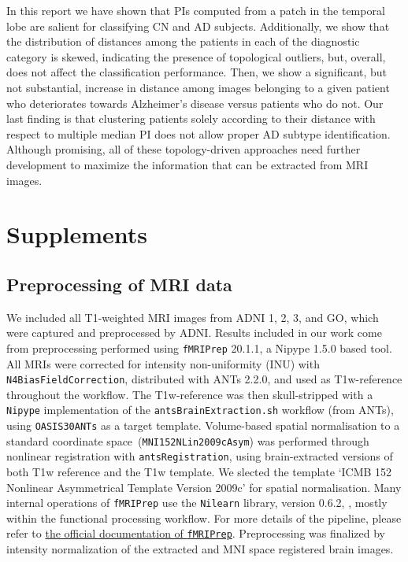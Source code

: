\documentclass{article}
\begin{document}
In this report we have shown that PIs computed from a patch in the temporal lobe are salient for
classifying CN and AD subjects. Additionally, we show that the distribution of distances among the
patients in each of the diagnostic category is skewed, indicating the presence of topological
outliers, but, overall, does not affect the classification performance. Then, we show a significant,
but not substantial, increase in distance among images belonging to a given patient who deteriorates
towards Alzheimer's disease versus patients who do not. Our last finding is that clustering patients
solely according to their distance with respect to multiple median PI does not allow proper AD
subtype identification. Although promising, all of these topology-driven approaches need further
development to maximize the information that can be extracted from MRI images.

\clearpage



\clearpage
\appendix

\section{Supplements}
\subsection{Preprocessing of MRI data}\label{apd:preprocessing}
We included all T1-weighted MRI images from ADNI 1, 2, 3, and GO, which were captured and
preprocessed by ADNI. Results included in our work come from preprocessing performed using
\texttt{fMRIPrep} 20.1.1, a Nipype 1.5.0 based tool. All MRIs were corrected for intensity
non-uniformity (INU) with \texttt{N4BiasFieldCorrection}, distributed with ANTs 2.2.0, and used as
T1w-reference throughout the workflow. The T1w-reference was then skull-stripped with a
\texttt{Nipype} implementation of the \texttt{antsBrainExtraction.sh} workflow (from ANTs), using
\texttt{OASIS30ANTs} as a target template.
Volume-based spatial normalisation to a standard coordinate space~(\texttt{MNI152NLin2009cAsym}) was
performed through nonlinear registration with \texttt{antsRegistration}, using brain-extracted
versions of both T1w reference and the T1w template. We slected the template `ICMB 152 Nonlinear
Asymmetrical Template Version 2009c' for spatial normalisation.
Many internal operations of \texttt{fMRIPrep} use the
\texttt{Nilearn} library, version 0.6.2, %
, mostly within the functional processing workflow.
For more details of the pipeline, please refer to
\href{https://fMRIPrep.readthedocs.io/en/latest/workflows.html}{the official documentation of
  \texttt{fMRIPrep}}. Preprocessing was finalized by intensity normalization of the extracted and
MNI space registered brain images.
\end{document}
